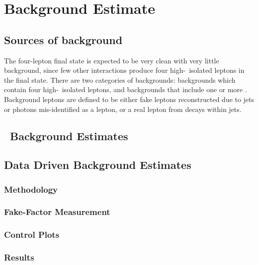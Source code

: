 \graphicspath{{Chapters/BackgroundEstimate/Figures/}}
\chapter{Background Estimate}
\label{chap:BackgroundEstimate}
\section{Sources of background}
The four-lepton final state is expected to be very clean with very little
background, since few other interactions produce four high-\pt\ isolated leptons
in the final state. There are two categories of backgrounds: 
backgrounds which contain four high-\pt\ isolated leptons, and 
backgrounds that include one or more . Background
leptons are defined to be either fake leptons reconstructed due to jets or
photons mis-identified as a lepton, or a real lepton from decays within jets.

\section{\mc\ Background Estimates}
\section{Data Driven Background Estimates}
\subsection{Methodology}
\subsection{Fake-Factor Measurement}
\subsection{Control Plots}
\subsection{Results}
